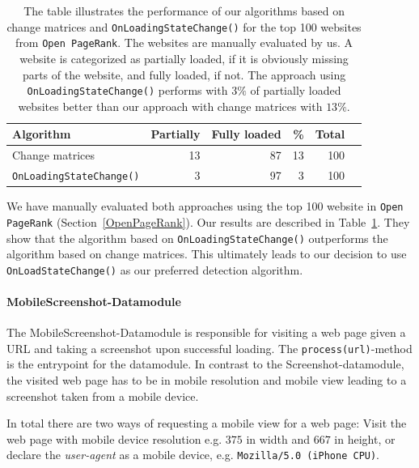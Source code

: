 \begin{table}
	\centering
	\begin{tabularx}{\textwidth}{lrrrrr}
		\textbf{Algorithm} & \textbf{Partially} & \textbf{Fully loaded} & \textbf{\%}  & \textbf{Total} \\ \hline
		Change matrices & 13 & 87 & 13 & 100 \\
		\texttt{OnLoadingStateChange()} & 3 &  97 & 3 & 100
	\end{tabularx}
	\caption[Performance of algorithms for detecting website loading completion]{The table illustrates the performance of our algorithms based on change matrices and \texttt{OnLoadingStateChange()} for the top 100 websites from \texttt{Open PageRank}. The websites are manually evaluated by us. A website is categorized as partially loaded, if it is obviously missing parts of the website, and fully loaded, if not. The approach using \texttt{OnLoadingStateChange()} performs with $3\%$ of partially loaded websites better than our approach with change matrices with $13\%$.}
	\label{table_compare_algorithm_screenshot}
\end{table}

We have manually evaluated both approaches using the top 100 website in \texttt{Open PageRank} (Section~\ref{OpenPageRank}). Our results are described in Table~\ref{table_compare_algorithm_screenshot}. They show that the algorithm based on \texttt{OnLoadingStateChange()} outperforms the algorithm based on change matrices. This ultimately leads to our decision to use \texttt{OnLoadStateChange()} as our preferred detection algorithm.

\paragraph*{MobileScreenshot-Datamodule}
\label{datacrawler_mobilescreenshot_datamodule}
The MobileScreenshot-Datamodule is responsible for visiting a web page given a URL and taking a screenshot upon successful loading. The \texttt{process(url)}-method is the entrypoint for the datamodule.
In contrast to the Screenshot-datamodule, the visited web page has to be in mobile resolution and mobile view leading to a screenshot taken from a mobile device.

In total there are two ways of requesting a mobile view for a web page: Visit the web page with mobile device resolution e.g. $375$ in width and $667$ in height, or declare the \textit{user-agent} as a mobile device, e.g.  \texttt{Mozilla/5.0 (iPhone CPU)}.

